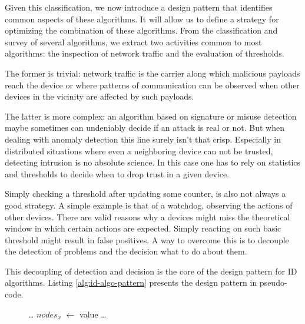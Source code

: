 \documentclass[conference]{IEEEtran}
\newcommand*\Let[2]{\State #1 $\gets$ #2}
\let\ForEach\ForAll
\begin{document}
Given this classification, we now introduce a design pattern that identifies
common aspects of these algorithms. It will allow us to define a strategy for
optimizing the combination of these algorithms. From the classification and
survey of several algorithms, we extract two activities common to most
algorithms: the inspection of network traffic and the evaluation of thresholds.

The former is trivial: network traffic is the carrier along which malicious
payloads reach the device or where patterns of communication can be observed
when other devices in the vicinity are affected by such payloads.

The latter is more complex: an algorithm based on signature or misuse detection
maybe sometimes can undeniably decide if an attack is real or not. But when
dealing with anomaly detection this line surely isn't that crisp. Especially in
distributed situations where even a neighboring device can not be trusted,
detecting intrusion is no absolute science. In this case one has to rely on
statistics and thresholds to decide when to drop trust in a given device.

Simply checking a threshold after updating some counter, is also not always a
good strategy. A simple example is that of a
watchdog\cite{mishra2004intrusion}, observing the actions of other devices.
There are valid reasons why a devices might miss the theoretical window in
which certain actions are expected. Simply reacting on such basic threshold
might result in false positives. A way to overcome this is to decouple the
detection of problems and the decision what to do about them.

This decoupling of detection and decision is the core of the design pattern for
ID algorithms. Listing \ref{alg:id-algo-pattern} presents the design pattern in
pseudo-code.

\begin{figure}[!ht]
\begin{algorithmic}[1]
    \ForEach{$byte \in msg$} \label{alg:id-algo-pattern-loop1}
     \State \dots {}
    \EndFor
    \Let{$nodes_x$}{value}  
    \State {}  \label{alg:id-algo-pattern-send1}
  \EndFunction
  \State
    \ForEach{$node \in nodes$} \label{alg:id-algo-pattern-loop2} \label{alg:id-algo-pattern-common-data}
       
        \State \dots {}
        \State {}  \label{alg:id-algo-pattern-send2}
      \EndIf
    \EndFor
  \EndFunction
  \State
\end{algorithmic}
\end{figure}
\end{document}
